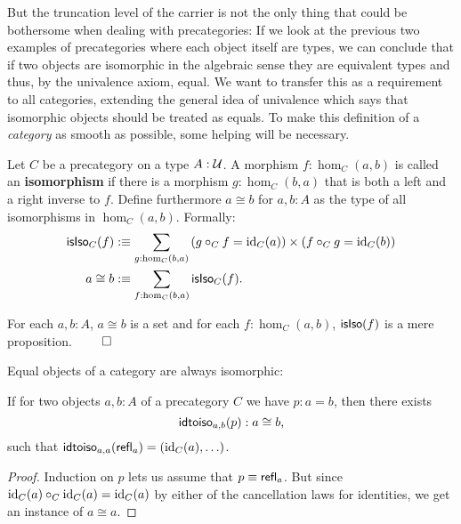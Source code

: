 But the truncation level of the carrier is not the only thing that could be bothersome
when dealing with precategories:
If we look at the previous two examples of precategories where each object itself
are types, we can conclude that if two objects are isomorphic in the algebraic sense
they are equivalent types and thus, by the univalence axiom, equal.
We want to transfer this as a requirement to all categories, extending the general
idea of univalence which says that isomorphic objects should be treated as equals.
To make this definition of a \emph{category} as smooth as possible, some helping
will be necessary.

\begin{defn}[Isomorphisms]
Let $C$ be a precategory on a type $A : \mathcal{U}$. A morphism $f : \hom_C(a, b)$ is
called an \textbf{isomorphism} if there is a morphism $g : \hom_C(b,a)$ that
is both a left and a right inverse to $f$.
Define furthermore $a \cong b$ for $a, b : A$ as the type of all isomorphisms in
$\hom_C(a, b)$.
Formally:
\begin{align*}
\mathsf{isIso}_C(f) &:\equiv \sum_{g:\hom_C(b,a)}
	\left(g \circ_C f = \operatorname{id}_C(a)\right) \times \left(f \circ_C g = \operatorname{id}_C(b)\right) \\
a \cong b &:\equiv \sum_{f:\hom_C(b,a)} \mathsf{isIso}_C(f) \text{.}
\end{align*}
\end{defn}

\begin{lemma}
For each $a, b : A$, $a \cong b$ is a set and for each $f : \hom_C(a, b)$,
$\mathsf{isIso}(f)$ is a mere proposition. \hfill $\qed$
\end{lemma}

Equal objects of a category are always isomorphic: %

\begin{lemma}
If for two objects $a, b : A$ of a precategory $C$ we have $p : a = b$, then there
exists
\begin{equation*}
\mathsf{idtoiso}_{a,b}(p) : a \cong b \text{,}
\end{equation*}
such that $\mathsf{idtoiso}_{a,a}(\mathsf{refl}_a) = \left(\operatorname{id}_C(a),\ldots\right)$. %
\end{lemma}

\begin{proof}
Induction on $p$ lets us assume that $p \equiv \mathsf{refl}_a$. But since
$\operatorname{id}_C(a) \circ_C \operatorname{id}_C(a) = \operatorname{id}_C(a)$ by either of the cancellation laws for
identities, we get an instance of $a \cong a$.
\end{proof}

